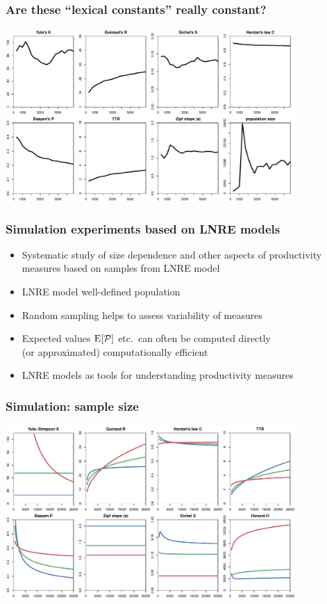 \documentclass[t]{beamer} %
\begin{document}
\begin{frame}[c]
  \frametitle{Are these ``lexical constants'' really constant?}

  \centering
  \includegraphics[width=11cm]{img/bare_bncS_obs_lexical_constants}
\end{frame}

\begin{frame}
  \frametitle{Simulation experiments based on LNRE models}

  \begin{itemize}
  \item Systematic study of size dependence and other aspects of productivity
    measures based on samples from LNRE model
  \item LNRE model \so well-defined population
  \item Random sampling helps to assess variability of measures
  \item Expected values $\mathrm{E}_{}[\mathcal{P}]$ etc.\ can often be computed directly\\ (or approximated) \so computationally efficient
  \item[\So] LNRE models as tools for understanding productivity measures
  \end{itemize}
\end{frame}

\begin{frame}[c]
  \frametitle{Simulation: sample size}

  \centering
  \includegraphics[width=11cm]{img/lexconst_sample_size}
\end{frame}
\end{document}
